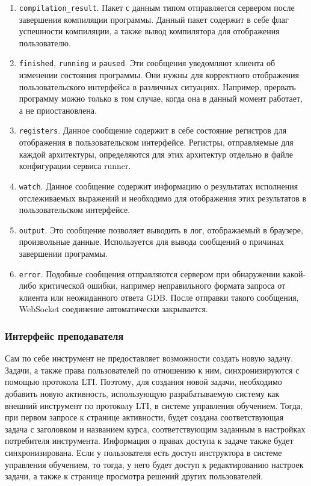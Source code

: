 \documentclass[a4paper,article,14pt]{extarticle}
\begin{document}
\begin{enumerate}
    \item \texttt{compilation\_result}. Пакет с данным типом отправляется сервером после завершения компиляции программы. Данный пакет содержит в себе флаг успешности компиляции, а также вывод компилятора для отображения пользователю.
    \item \texttt{finished}, \texttt{running} и \texttt{paused}. Эти сообщения уведомляют клиента об изменении состояния программы. Они нужны для корректного отображения пользовательского интерфейса в различных ситуациях. Например, прервать программу можно только в том случае, когда она в данный момент работает, а не приостановлена.
    \item \texttt{registers}. Данное сообщение содержит в себе состояние регистров для отображения в пользовательском интерфейсе. Регистры, отправляемые для каждой архитектуры, определяются для этих архитектур отдельно в файле конфигурации сервиса runner.
    \item \texttt{watch}. Данное сообщение содержит информацию о результатах исполнения отслеживаемых выражений и необходимо для отображения этих результатов в пользовательском интерфейсе.
    \item \texttt{output}. Это сообщение позволяет выводить в лог, отображаемый в браузере, произвольные данные. Используется для вывода сообщений о причинах завершении программы.
    \item \texttt{error}. Подобные сообщения отправляются сервером при обнаружении какой-либо критической ошибки, например неправильного формата запроса от клиента или неожиданного ответа GDB. После отправки такого сообщения, WebSocket соединение автоматически закрывается.
\end{enumerate}

\subsubsection{Интерфейс преподавателя}

Сам по себе инструмент не предоставляет возможности создать новую задачу. Задачи, а также права пользователей по отношению к ним, синхронизируются с помощью протокола LTI. Поэтому, для создания новой задачи, необходимо добавить новую активность, использующую разрабатываемую систему как внешний инструмент по протоколу LTI, в системе управления обучением. Тогда, при первом запросе к странице активности, будет создана соответствующая задача с заголовком и названием курса, соответствующим заданным в настройках потребителя инструмента. Информация о правах доступа к задаче также будет синхронизирована. Если у пользователя есть доступ инструктора в системе управления обучением, то тогда, у него будет доступ к редактированию настроек задачи, а также к странице просмотра решений других пользователей.
\end{document}
